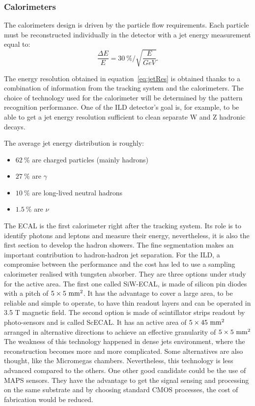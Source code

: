       \subsubsection{Calorimeters}

      The calorimeters design is driven by the particle flow requirements.
      Each particle must be reconstructed individually in the detector with a jet energy measurement equal to:
      \begin{equation}
        \frac{\Delta E}{E} = 30~\% / \sqrt{\frac{E}{GeV}}.
        \label{eq:jetRes}
      \end{equation}

      The energy resolution obtained in equation~\ref{eq:jetRes} is obtained thanks to a combination of information from the tracking system and the calorimeters. 
      The choice of technology used for the calorimeter will be determined by the pattern recognition performance. 
      One of the \gls{ILD} detector's goal is, for example, to be able to get a jet energy resolution sufficient to clean separate W and Z hadronic decays.
      
      The average jet energy distribution is roughly: 
      \begin{itemize}
        \item $62~\%$ are charged particles (mainly hadrons)
        \item $27~\%$ are $\gamma$
        \item $10~\%$ are long-lived neutral hadrons
        \item $1.5~\%$ are $\nu$
      \end{itemize}

      The \gls{ECAL} is the first calorimeter right after the tracking system.
      Its role is to identify photons and leptons and measure their energy, nevertheless, it is also the first section to develop the hadron showers.
      The fine segmentation makes an important contribution to hadron-hadron jet separation.
      For the \gls{ILD}, a compromise between the performance and the cost has led to use a sampling calorimeter realised with tungsten absorber.
      They are three options under study for the active area.
      The first one called SiW-ECAL, is made of silicon pin diodes with a pitch of $5 \times 5~\rm{mm}^2$. 
      It has the advantage to cover a large area, to be reliable and simple to operate, to have thin readout layers and can be operated in 3.5 T magnetic field.
      The second option is made of scintillator strips readout by photo-sensors and is called ScECAL.
      It has an active area of $5 \times 45~\rm{mm}^2$ arranged in alternative directions to achieve an effective granularity of $5 \times 5~\rm{mm}^2$ 
      The weakness of this technology happened in dense jets environment, where the reconstruction becomes more and more complicated.
      Some alternatives are also thought, like the Micromegas chambers. Nevertheless, this technology is less advanced compared to the others.
      One other good candidate could be the use of \gls{MAPS} sensors.
      They have the advantage to get the signal sensing and processing on the same  substrate and by choosing standard CMOS processes, the cost of fabrication would be reduced.

